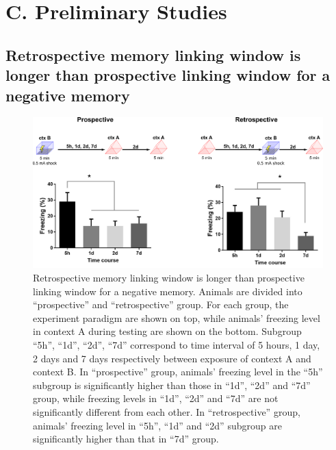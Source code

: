 \documentclass[master.tex]{subfiles}
\begin{document}
\section*{C. Preliminary Studies}

\subsection*{Retrospective memory linking window is longer than prospective
  linking window for a negative memory}

\begin{figure}
  \centering \includegraphics[scale = .095]{Figures/pro_retro_prelim.pdf}
  \caption{\footnotesize Retrospective memory linking window is longer than
    prospective linking window for a negative memory. Animals are divided into
    ``prospective'' and ``retrospective'' group. For each group, the experiment
    paradigm are shown on top, while animals' freezing level in context A during
    testing are shown on the bottom. Subgroup ``5h'', ``1d'', ``2d'', ``7d''
    correspond to time interval of 5 hours, 1 day, 2 days and 7 days
    respectively between exposure of context A and context B. In ``prospective''
    group, animals' freezing level in the ``5h'' subgroup is significantly
    higher than those in ``1d'', ``2d'' and ``7d'' group, while freezing levels
    in ``1d'', ``2d'' and ``7d'' are not significantly different from each
    other. In ``retrospective'' group, animals' freezing level in ``5h'', ``1d''
    and ``2d'' subgroup are significantly higher than that in ``7d'' group.}
  \label{fig:prelim_pro_retro}
\end{figure}

\end{document}
